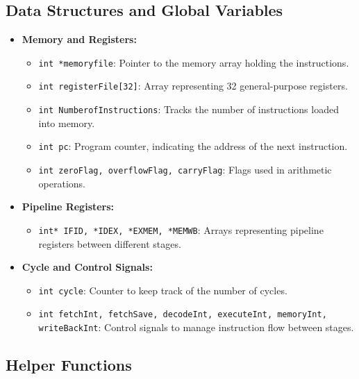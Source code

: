 \documentclass{article}
\begin{document}
\begin{enumerate}
\end{enumerate}


\subsection{Data Structures and Global Variables}

\begin{itemize}
    \item \textbf{Memory and Registers:}
    \begin{itemize}
        \item \texttt{int *memoryfile}: Pointer to the memory array holding the instructions.
        \item \texttt{int registerFile[32]}: Array representing 32 general-purpose registers.
        \item \texttt{int NumberofInstructions}: Tracks the number of instructions loaded into memory.
        \item \texttt{int pc}: Program counter, indicating the address of the next instruction.
        \item \texttt{int zeroFlag, overflowFlag, carryFlag}: Flags used in arithmetic operations.
    \end{itemize}
    \item \textbf{Pipeline Registers:}
    \begin{itemize}
        \item \texttt{int* IFID, *IDEX, *EXMEM, *MEMWB}: Arrays representing pipeline registers between different stages.
    \end{itemize}
    \item \textbf{Cycle and Control Signals:}
    \begin{itemize}
        \item \texttt{int cycle}: Counter to keep track of the number of cycles.
        \item \texttt{int fetchInt, fetchSave, decodeInt, executeInt, memoryInt, writeBackInt}: Control signals to manage instruction flow between stages.
    \end{itemize}
\end{itemize}

\subsection{Helper Functions}
\end{document}
